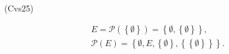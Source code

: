 \begin{tiny}(Cvs25)\end{tiny}
\begin{multline*}
 E = \mathcal{P}(\left\lbrace \emptyset\right\rbrace )
 = \left\lbrace \emptyset, \left\lbrace  \emptyset\right\rbrace \right\rbrace,\\
 \mathcal{P}(E)
 = \left\lbrace \emptyset, E, \left\lbrace \emptyset \right\rbrace , \left\lbrace  \left\lbrace \emptyset \right\rbrace \right\rbrace \right\rbrace .
\end{multline*}
